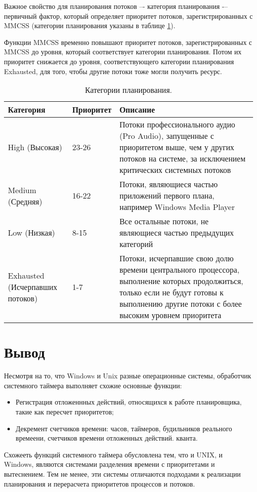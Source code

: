Важное свойство для планирования потоков –- категория планирования -– первичный фактор, который определяет приоритет потоков, зарегистрированных с MMCSS (категории планирования указаны в таблице \ref{tab:plan}).

Функции MMCSS временно повышают приоритет потоков, зарегистрированных с MMCSS до уровня, который соответствует категории планирования. Потом их приоритет снижается до уровня, соответствующего категории планирования Exhausted, для того, чтобы другие потоки тоже могли
получить ресурс.

\begin{table}[h]
    \caption{Категории планирования.}
    \begin{center}
        \begin{tabular}{|p{45mm}|p{30mm}|p{80mm}|}
            \hline
            \textbf{Категория} & \textbf{Приоритет} & \textbf{Описание} \\
            \hline
            High (Высокая) & 23-26 & Потоки профессионального аудио (Pro Audio), запущенные с приоритетом выше, чем у других потоков на системе, за исключением критических системных потоков \\
            \hline
            Medium (Средняя) & 16-22 & Потоки, являющиеся частью приложений первого плана, например Windows Media Player \\
            \hline
            Low (Низкая) & 8-15 & Все остальные потоки, не являющиеся частью предыдущих категорий \\
            \hline
            Exhausted (Исчерпавших потоков) & 1-7 & Потоки, исчерпавшие свою долю времени центрального процессора, выполнение которых продолжиться, только если не будут готовы к выполнению другие потоки с более высоким уровнем приоритета \\
            \hline
        \end{tabular}
    \end{center}
    \label{tab:plan}
\end{table}


\chapter*{Вывод}

Несмотря на то, что Windows и Unix разные операционные системы, обработчик системного таймера выполняет схожие основные функции:
\begin{itemize}
\item Регистрация отложеннных действий, относящихся к работе планировщика, такие как пересчет приоритетов;
\item Декремент счетчиков времени: часов, таймеров, будильников реального времеени, счетчиков времени отложенных действий.
 кванта.
\end{itemize}
Схожееть функций системного таймера обусловлена тем, что и UNIX, и Windows, являются системами разделения времени с приоритетами и вытеснением. Тем не менее, эти системы отличаются подходами
к реализации планирования и перерасчета приоритетов процессов и потоков.
